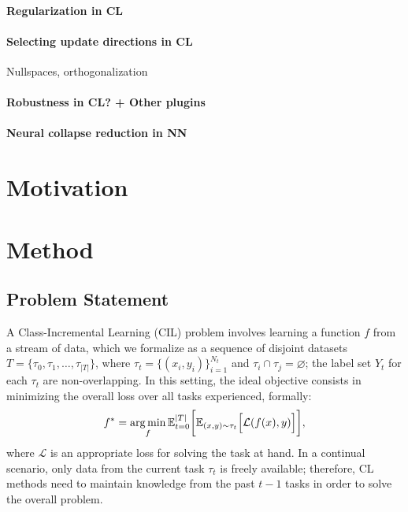 \documentclass{article}
\DeclareMathOperator*{\argmin}{arg\,min}
\begin{document}
\paragraph{Regularization in CL}

\paragraph{Selecting update directions in CL}
Nullspaces, orthogonalization

\paragraph{Robustness in CL? + Other plugins}

\paragraph{Neural collapse reduction in NN}

\section{Motivation}

\section{Method}

\subsection{Problem Statement}
A Class-Incremental Learning (CIL) problem involves learning a function $f$ from a stream of data, which we formalize as a sequence of disjoint datasets $T=\{\tau_0, \tau_1, \ldots, \tau_{|T|}\}$, where $\tau_t = \{(x_i, y_i)\}_{i=1}^{N_t}$ and $\tau_i\cap\tau_j=\varnothing$; the label set $Y_t$ for each $\tau_t$ are non-overlapping. In this setting, the ideal objective consists in minimizing the overall loss over all tasks experienced, formally:
\begin{equation}
    f^*=\argmin_{f}{\mathbb{E}_{t=0}^{|T|}{\bigg{[}\mathbb{E}_{(x,y)\sim\tau_t}{\Big{[}\mathcal{L}(f(x),y)\Big{]}}\bigg{]}}},
\end{equation}
where $\mathcal{L}$ is an appropriate loss for solving the task at hand. In a continual scenario, only data from the current task $\tau_t$ is freely available; therefore, CL methods need to maintain knowledge from the past $t-1$ tasks in order to solve the overall problem.
\end{document}
